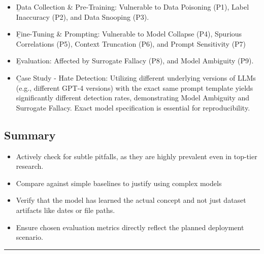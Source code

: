 \begin{itemize}
\item \b{Data Collection \& Pre-Training}: Vulnerable to Data Poisoning (P1), Label Inaccuracy (P2), and Data Snooping (P3).
\item \b{Fine-Tuning \& Prompting}: Vulnerable to Model Collapse (P4), Spurious Correlations (P5), Context Truncation (P6), and Prompt Sensitivity (P7)
\item \b{Evaluation}: Affected by Surrogate Fallacy (P8), and Model Ambiguity (P9).
\item \b{Case Study - Hate Detection}: Utilizing different underlying versions of LLMs (e.g., different GPT-4 versions) with the exact same prompt template yields significantly different detection rates, demonstrating Model Ambiguity and Surrogate Fallacy. Exact model specification is essential for reproducibility.
\end{itemize}



\subsection{Summary}

\begin{itemize}
\item Actively check for subtle pitfalls, as they are highly prevalent even in top-tier research.
\item Compare against simple baselines to justify using complex models
\item Verify that the model has learned the actual concept and not just dataset artifacts like dates or file paths.
\item Ensure chosen evaluation metrics directly reflect the planned deployment scenario.
\end{itemize}

\vspace{1.5em}
\hrule
